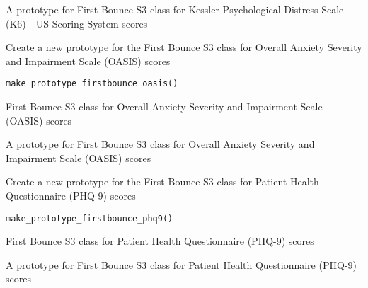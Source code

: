 \documentclass[a4paper]{book}
\begin{document}
%
\begin{Value}
A prototype for First Bounce S3 class for Kessler Psychological Distress Scale (K6) - US Scoring System scores
\end{Value}
%
\begin{Description}\relax
Create a new prototype for the First Bounce S3 class for Overall Anxiety Severity and Impairment Scale (OASIS) scores
\end{Description}
%
\begin{Usage}
\begin{verbatim}
make_prototype_firstbounce_oasis()
\end{verbatim}
\end{Usage}
%
\begin{Details}\relax
First Bounce S3 class for Overall Anxiety Severity and Impairment Scale (OASIS) scores
\end{Details}
%
\begin{Value}
A prototype for First Bounce S3 class for Overall Anxiety Severity and Impairment Scale (OASIS) scores
\end{Value}
%
\begin{Description}\relax
Create a new prototype for the First Bounce S3 class for Patient Health Questionnaire (PHQ-9) scores
\end{Description}
%
\begin{Usage}
\begin{verbatim}
make_prototype_firstbounce_phq9()
\end{verbatim}
\end{Usage}
%
\begin{Details}\relax
First Bounce S3 class for Patient Health Questionnaire (PHQ-9) scores
\end{Details}
%
\begin{Value}
A prototype for First Bounce S3 class for Patient Health Questionnaire (PHQ-9) scores
\end{Value}
\end{document}
